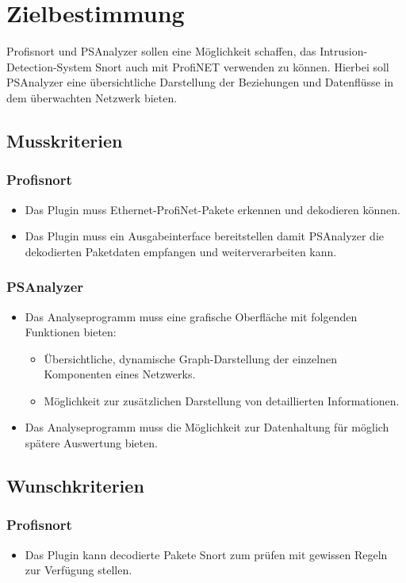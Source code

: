 \chapter{Zielbestimmung}

Profisnort und PSAnalyzer sollen eine Möglichkeit schaffen, das Intrusion-Detection-System Snort auch mit ProfiNET verwenden zu können.
Hierbei soll PSAnalyzer eine übersichtliche Darstellung der Beziehungen und Datenflüsse in dem überwachten Netzwerk bieten.

\section{Musskriterien}

\subsection{Profisnort}
\begin{itemize}
  \item Das Plugin muss Ethernet-ProfiNet-Pakete erkennen und dekodieren können.
  \item Das Plugin muss ein Ausgabeinterface bereitstellen damit PSAnalyzer die dekodierten Paketdaten empfangen und weiterverarbeiten kann.
\end{itemize}

\subsection{PSAnalyzer}
\begin{itemize}
  \item Das Analyseprogramm muss eine grafische Oberfläche mit folgenden Funktionen bieten:
  \begin{itemize}
    \item Übersichtliche, dynamische Graph-Darstellung der einzelnen Komponenten eines Netzwerks.
    \item Möglichkeit zur zusätzlichen Darstellung von detaillierten Informationen.
  \end{itemize}
  \item Das Analyseprogramm muss die Möglichkeit zur Datenhaltung für möglich spätere Auswertung bieten. 
\end{itemize}

\section{Wunschkriterien}
\subsection{Profisnort}
\begin{itemize}
  \item Das Plugin kann decodierte Pakete Snort zum prüfen mit gewissen Regeln zur Verfügung stellen. 
\end{itemize}
